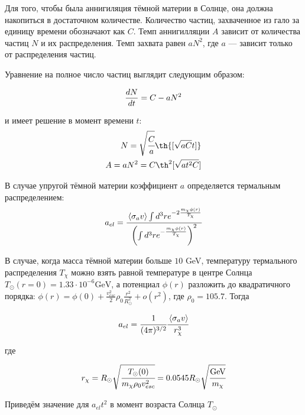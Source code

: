 Для того, чтобы была аннигиляция тёмной материи в Солнце, она должна накопиться в достаточном количестве. Количество частиц, захваченное из гало за единицу времени обозначают как $C$. Темп аннигилляции $A$ зависит от количества частиц $N$ и их распределения. Темп захвата равен $aN^2$, где $a$ --- зависит только от распределения частиц. 

Уравнение на полное число частиц выглядит следующим образом:

\begin{equation}
	\frac{d N}{d t} = C - aN^2
\end{equation}

\noindent и имеет решение в момент времени $t$:
\begin{equation}
\begin{split}
	N = \sqrt{\cfrac{C}{a}} \th{[\sqrt{aC}t]} \\
	A = aN^2 = C \th^2{[\sqrt{at^2C}]}
	\label{eq:AnnNtherm}
\end{split}
\end{equation}
	

В случае упругой тёмной материи коэффициент $a$ определяется термальным распределением:
\begin{equation}
	a_{el} = \cfrac{
		\left\langle \sigma_{a}v \right\rangle \int{d^3 r e^{-2 \frac{m_{\chi}\phi(r)}{T_{\chi}} }}
	}{\left(
		\int{d^3 r e^{- \frac{m_{\chi}\phi(r)}{T_{\chi}} }}
	\right)^2}
\end{equation}

В случае, когда масса тёмной материи больше $10$ GeV, температуру термального распределения $T_{\chi}$ можно взять равной температуре в центре Солнца $T_{\odot}(r=0) = 1.33\cdot10^{-6} \text{GeV}$, а потенциал $\phi(r)$ разложить до квадратичного порядка: $\phi(r) =\phi(0)+ \frac{v_{esc}^2}{2} \rho_0 \frac{r^2}{R_{\odot}^2} + o(r^2)$,  где $\rho_0 = 105.7$. Тогда

\begin{equation}
	a_{el} = \cfrac{1}{(4\pi)^{3/2}} \cfrac{\left\langle \sigma_{a}v \right\rangle}{ r_{\chi}^3 }
\end{equation}

где

\begin{equation}
	r_{\chi} = R_{\odot} \sqrt{\cfrac{T_{\odot}(0) }{m_{\chi}\rho_0 v_{esc}^2}} =  0.0545 R_{\odot} \sqrt{\cfrac{ \text{GeV}}{m_{\chi}}}
\end{equation}

Приведём значение для $a_{el}t^2$ в момент возраста Солнца $T_{\odot}$

